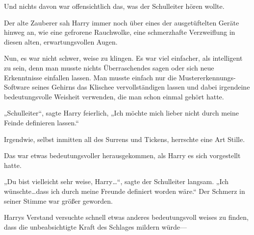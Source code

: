 Und nichts davon war offensichtlich das, was der Schulleiter hören wollte.

Der alte Zauberer sah Harry immer noch über eines der ausgetüftelten Geräte hinweg an, wie eine gefrorene Rauchwolke, eine schmerzhafte Verzweiflung in diesen alten, erwartungsvollen Augen.

Nun, es war nicht schwer, weise zu klingen. Es war viel einfacher, als intelligent zu sein, denn man musste nichts Überraschendes sagen oder sich neue Erkenntnisse einfallen lassen. Man musste einfach nur die Mustererkennungs-Software seines Gehirns das Klischee vervollständigen lassen und dabei irgendeine bedeutungsvolle Weisheit verwenden, die man schon einmal gehört hatte.

„Schulleiter“, sagte Harry feierlich, „Ich möchte mich lieber nicht durch meine Feinde definieren lassen.“

Irgendwie, selbst inmitten all des Surrens und Tickens, herrschte eine Art Stille.

Das war etwas bedeutungsvoller herausgekommen, als Harry es sich vorgestellt hatte.

„Du bist vielleicht sehr weise, Harry…“, sagte der Schulleiter langsam. „Ich wünschte…dass ich durch meine Freunde definiert worden wäre.“ Der Schmerz in seiner Stimme war größer geworden.

Harrys Verstand versuchte schnell etwas anderes bedeutungsvoll weises zu finden, dass die unbeabsichtigte Kraft des Schlages mildern würde—

